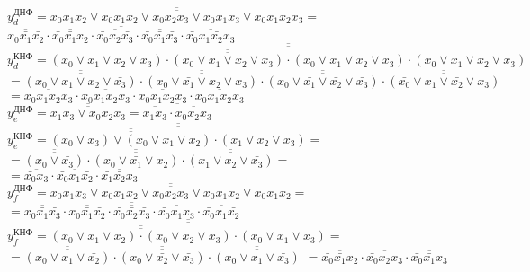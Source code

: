 \documentclass{bmstu}
\begin{document}
	$y^{\text{ДНФ}}_d = \overline{\overline{x_0 \bar{x_1} \bar{x_2} \vee\bar{x_0} \bar{x_1} x_2 \vee\bar{x_0} x_2 \bar{x_3} \vee\bar{x_0} \bar{x_1} \bar{x_3} \vee\bar{x_0} x_1 \bar{x_2} x_3}} =$ \\
	$\overline{\overline{x_0 \bar{x_1} \bar{x_2}} \cdot \overline{\bar{x_0} \bar{x_1} x_2} \cdot \overline{\bar{x_0} x_2 \bar{x_3}} \cdot \overline{\bar{x_0} \bar{x_1} \bar{x_3}} \cdot \overline{\bar{x_0} x_1 \bar{x_2} x_3}}$ \\
	$y^{\text{КНФ}}_d = \overline{\overline{\overline{\overline{(x_0 \vee x_1 \vee x_2 \vee \bar{x_3}) \cdot(x_0 \vee \bar{x_1} \vee x_2 \vee x_3) \cdot(x_0 \vee \bar{x_1} \vee \bar{x_2} \vee \bar{x_3})}} \cdot (\bar{x_0} \vee x_1 \vee \bar{x_2} \vee x_3)}}$ \\
	$= \overline{\overline{(x_0 \vee x_1 \vee x_2 \vee \bar{x_3})}} \cdot \overline{\overline{(x_0 \vee \bar{x_1} \vee x_2 \vee x_3)}} \cdot\overline{\overline{(x_0 \vee \bar{x_1} \vee \bar{x_2} \vee \bar{x_3})}} \cdot \overline{\overline{(\bar{x_0} \vee x_1 \vee \bar{x_2} \vee x_3)}}$ \\
	$= \overline{\bar{x_0} \bar{x_1} \bar{x_2} x_3} \cdot \overline{\bar{x_0} x_1 \bar{x_2} \bar{x_3}} \cdot \overline{\bar{x_0} x_1 x_2 x_3} \cdot \overline{x_0 \bar{x_1} x_2 \bar{x_3}}$ \\
	
	$y^{\text{ДНФ}}_e = \overline{\overline{\bar{x_1} \bar{x_3} \vee \bar{x_0} x_2 \bar{x_3}}} = \overline{\overline{\bar{x_1} \bar{x_3}} \cdot \overline{\bar{x_0} x_2 \bar{x_3}}}$ \\
	$y^{\text{КНФ}}_e = \overline{\overline{\overline{\overline{(x_0 \vee \bar{x_3}) \vee (x_0 \vee \bar{x_1} \vee x_2)}} \cdot (x_1 \vee x_2 \vee \bar{x_3})}} =$ \\
	$= \overline{\overline{(x_0 \vee \bar{x_3})}} \cdot \overline{\overline{(x_0 \vee \bar{x_1} \vee x_2)}} \cdot \overline{\overline{(x_1 \vee x_2 \vee \bar{x_3})}} =$ \\
	$= \overline{\bar{x_0} x_3} \cdot \overline{\bar{x_0} x_1 \bar{x_2}} \cdot \overline{\bar{x_1} \bar{x_2} x_3}$ \\
	
	$y^{\text{ДНФ}}_f = \overline{\overline{x_0 \bar{x_1} \bar{x_3} \vee x_0 \bar{x_1} \bar{x_2} \vee \bar{x_0} \bar{x_2} \bar{x_3} \vee \bar{x_0} x_1 x_2 \vee \bar{x_0} x_1 \bar{x_2}}} =$ \\
	$= \overline{\overline{x_0 \bar{x_1} \bar{x_3}} \cdot \overline{x_0 \bar{x_1} \bar{x_2}} \cdot \overline{\bar{x_0} \bar{x_2} \bar{x_3}} \cdot \overline{\bar{x_0} x_1 x_3} \cdot \overline{\bar{x_0} x_1 \bar{x_2}}}$ \\
	$y^{\text{КНФ}}_f = \overline{\overline{\overline{\overline{(x_0 \vee x_1 \vee \bar{x_2}) \cdot(x_0 \vee \bar{x_2} \vee \bar{x_3})}} \cdot (x_0 \vee x_1 \vee \bar{x_3})}} =$ \\
	$= \overline{\overline{(x_0 \vee x_1 \vee \bar{x_2})}} \cdot \overline{\overline{(x_0 \vee \bar{x_2} \vee \bar{x_3})}} \cdot \overline{\overline{(x_0 \vee x_1 \vee \bar{x_3})}}$
	$= \overline{\bar{x_0} \bar{x_1} x_2} \cdot \overline{\bar{x_0} x_2 x_3} \cdot \overline{\bar{x_0} \bar{x_1} x_3}$ \\
	
\end{document}
